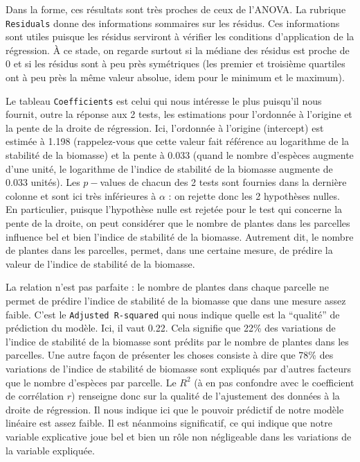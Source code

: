 \documentclass[
  a4paper,
]{article}
\begin{document}
Dans la forme, ces résultats sont très proches de ceux de l'ANOVA. La rubrique \texttt{Residuals} donne des informations sommaires sur les résidus. Ces informations sont utiles puisque les résidus serviront à vérifier les conditions d'application de la régression. À ce stade, on regarde surtout si la médiane des résidus est proche de 0 et si les résidus sont à peu près symétriques (les premier et troisième quartiles ont à peu près la même valeur absolue, idem pour le minimum et le maximum).

Le tableau \texttt{Coefficients} est celui qui nous intéresse le plus puisqu'il nous fournit, outre la réponse aux 2 tests, les estimations pour l'ordonnée à l'origine et la pente de la droite de régression. Ici, l'ordonnée à l'origine (intercept) est estimée à 1.198 (rappelez-vous que cette valeur fait référence au logarithme de la stabilité de la biomasse) et la pente à 0.033 (quand le nombre d'espèces augmente d'une unité, le logarithme de l'indice de stabilité de la biomasse augmente de 0.033 unités). Les \(p-\)values de chacun des 2 tests sont fournies dans la dernière colonne et sont ici très inférieures à \(\alpha\) : on rejette donc les 2 hypothèses nulles. En particulier, puisque l'hypothèse nulle est rejetée pour le test qui concerne la pente de la droite, on peut considérer que le nombre de plantes dans les parcelles influence bel et bien l'indice de stabilité de la biomasse. Autrement dit, le nombre de plantes dans les parcelles, permet, dans une certaine mesure, de prédire la valeur de l'indice de stabilité de la biomasse.

La relation n'est pas parfaite : le nombre de plantes dans chaque parcelle ne permet de prédire l'indice de stabilité de la biomasse que dans une mesure assez faible. C'est le \texttt{Adjusted\ R-squared} qui nous indique quelle est la ``qualité'' de prédiction du modèle. Ici, il vaut 0.22. Cela signifie que 22\% des variations de l'indice de stabilité de la biomasse sont prédits par le nombre de plantes dans les parcelles. Une autre façon de présenter les choses consiste à dire que 78\% des variations de l'indice de stabilité de biomasse sont expliqués par d'autres facteurs que le nombre d'espèces par parcelle. Le \(R^2\) (à en pas confondre avec le coefficient de corrélation \(r\)) renseigne donc sur la qualité de l'ajustement des données à la droite de régression. Il nous indique ici que le pouvoir prédictif de notre modèle linéaire est assez faible. Il est néanmoins significatif, ce qui indique que notre variable explicative joue bel et bien un rôle non négligeable dans les variations de la variable expliquée.
\end{document}
